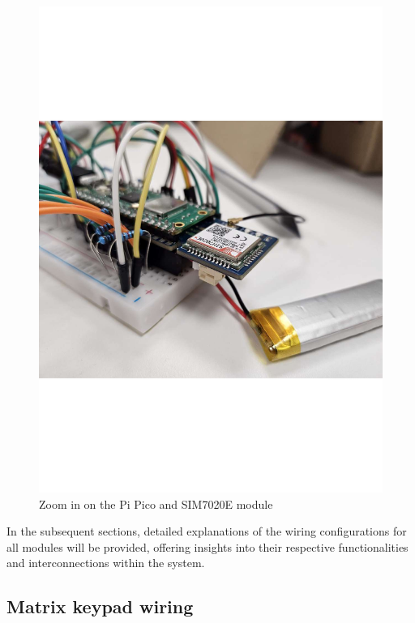\begin{figure}[h]
\begin{minipage}[b]{0.45\textwidth}
        \includegraphics[width=1\textwidth]{Imagenes/Vectorial/breadboard2.pdf}
        \caption{Zoom in on the Pi Pico and SIM7020E module}
        \label{fig:breadboard2}
    \end{minipage}
\end{figure}

In the subsequent sections, detailed explanations of the wiring configurations for all modules will be provided, 
offering insights into their respective functionalities and interconnections within the system.

\subsection{Matrix keypad wiring}

